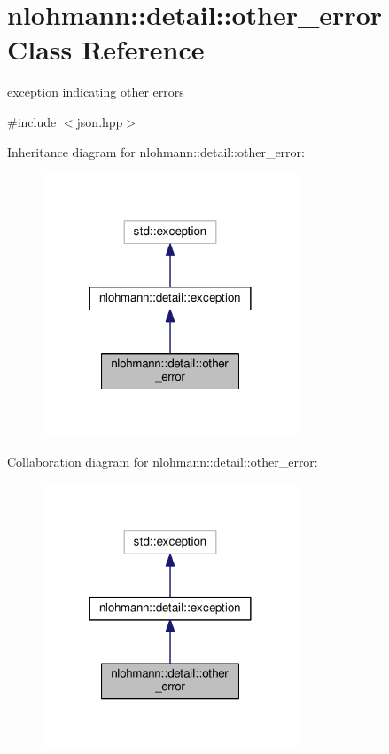 \hypertarget{classnlohmann_1_1detail_1_1other__error}{}\section{nlohmann\+:\+:detail\+:\+:other\+\_\+error Class Reference}
\label{classnlohmann_1_1detail_1_1other__error}


exception indicating other errors  




{\ttfamily \#include $<$json.\+hpp$>$}



Inheritance diagram for nlohmann\+:\+:detail\+:\+:other\+\_\+error\+:\nopagebreak
\begin{figure}[H]
\begin{center}
\leavevmode
\includegraphics[width=216pt]{classnlohmann_1_1detail_1_1other__error__inherit__graph}
\end{center}
\end{figure}


Collaboration diagram for nlohmann\+:\+:detail\+:\+:other\+\_\+error\+:\nopagebreak
\begin{figure}[H]
\begin{center}
\leavevmode
\includegraphics[width=216pt]{classnlohmann_1_1detail_1_1other__error__coll__graph}
\end{center}
\end{figure}
